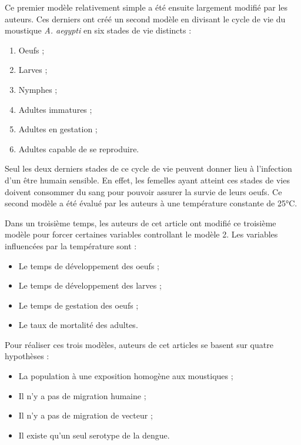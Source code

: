 \documentclass[
  12pt,
  oneside]{article}
\providecommand{\tightlist}{%
  \setlength{\itemsep}{0pt}\setlength{\parskip}{0pt}}
\begin{document}
Ce premier modèle relativement simple a été ensuite largement modifié
par les auteurs. Ces derniers ont créé un second modèle en divisant le
cycle de vie du moustique \emph{A. aegypti} en six stades de vie
distincts :

\begin{enumerate}
\def\labelenumi{\arabic{enumi}.}
\tightlist
\item
  Oeufs ;
\item
  Larves ;
\item
  Nymphes ;
\item
  Adultes immatures ;
\item
  Adultes en gestation ;
\item
  Adultes capable de se reproduire.
\end{enumerate}

Seul les deux derniers stades de ce cycle de vie peuvent donner lieu à
l'infection d'un être humain sensible. En effet, les femelles ayant
atteint ces stades de vies doivent consommer du sang pour pouvoir
assurer la survie de leurs oeufs. Ce second modèle a été évalué par les
auteurs à une température constante de 25°C.

Dans un troisième temps, les auteurs de cet article ont modifié ce
troisième modèle pour forcer certaines variables controllant le modèle
2. Les variables influencées par la température sont :

\begin{itemize}
\tightlist
\item
  Le temps de développement des oeufs ;
\item
  Le temps de développement des larves ;
\item
  Le temps de gestation des oeufs ;
\item
  Le taux de mortalité des adultes.
\end{itemize}

Pour réaliser ces trois modèles, auteurs de cet articles se basent sur
quatre hypothèses :

\begin{itemize}
\tightlist
\item
  La population à une exposition homogène aux moustiques ;
\item
  Il n'y a pas de migration humaine ;
\item
  Il n'y a pas de migration de vecteur ;
\item
  Il existe qu'un seul serotype de la dengue.
\end{itemize}
\end{document}
